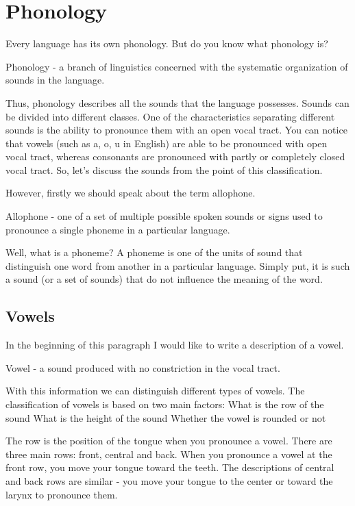 \chapter{Phonology}

Every language has its own phonology. But do you know what phonology is?

Phonology - a branch of linguistics concerned with the systematic organization of sounds in the language.

Thus, phonology describes all the sounds that the language possesses. Sounds can be divided into different classes. One of the characteristics separating different sounds is the ability to pronounce them with an open vocal tract. You can notice that vowels (such as a, o, u in English) are able to be pronounced with open vocal tract, whereas consonants are pronounced with partly or completely closed vocal tract. So, let's discuss the sounds from the point of this classification.

However, firstly we should speak about the term allophone.

Allophone - one of a set of multiple possible spoken sounds or signs used to pronounce a single phoneme in a particular language.

Well, what is a phoneme? A phoneme is one of the units of sound that distinguish one word from another in a particular language. Simply put, it is such a sound (or a set of sounds) that do not influence the meaning of the word. 


\section{Vowels}

In the beginning of this paragraph I would like to write a description of a vowel.

Vowel - a sound produced with no constriction in the vocal tract.

With this information we can distinguish different types of vowels. The classification of vowels is based on two main factors:
What is the row of the sound
What is the height of the sound
Whether the vowel is rounded or not

The row is the position of the tongue when you pronounce a vowel. There are three main rows: front, central and back. When you pronounce a vowel at the front row, you move your tongue toward the teeth. The descriptions of central and back rows are similar - you move your tongue to the center or toward the larynx to pronounce them.

